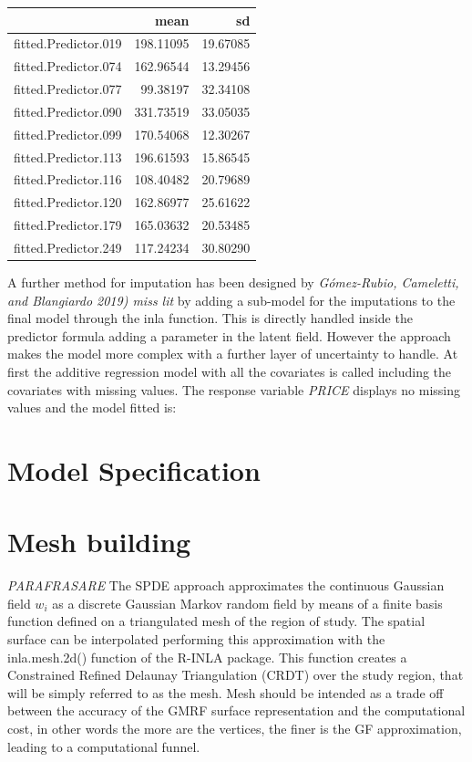 \documentclass[
  12pt,
  a4paper,
  oneside]{book}
\theoremstyle{definition}
\theoremstyle{definition}
\theoremstyle{definition}
\theoremstyle{remark}
\begin{document}
\begin{tabular}{lrr}
\toprule
  & mean & sd\\
\midrule
fitted.Predictor.019 & 198.11095 & 19.67085\\
fitted.Predictor.074 & 162.96544 & 13.29456\\
fitted.Predictor.077 & 99.38197 & 32.34108\\
fitted.Predictor.090 & 331.73519 & 33.05035\\
fitted.Predictor.099 & 170.54068 & 12.30267\\
\addlinespace
fitted.Predictor.113 & 196.61593 & 15.86545\\
fitted.Predictor.116 & 108.40482 & 20.79689\\
fitted.Predictor.120 & 162.86977 & 25.61622\\
fitted.Predictor.179 & 165.03632 & 20.53485\\
fitted.Predictor.249 & 117.24234 & 30.80290\\
\bottomrule
\end{tabular}

A further method for imputation has been designed by \emph{Gómez-Rubio, Cameletti, and Blangiardo 2019) miss lit} by adding a sub-model for the imputations to the final model through the inla function. This is directly handled inside the predictor formula adding a parameter in the latent field. However the approach makes the model more complex with a further layer of uncertainty to handle.
At first the additive regression model with all the covariates is called including the covariates with missing values. The response variable \emph{PRICE} displays no missing values and the model fitted is:

\hypertarget{model-specification}{%
\section{Model Specification}\label{model-specification}}

\hypertarget{mesh-building}{%
\section{Mesh building}\label{mesh-building}}

\emph{PARAFRASARE}
The SPDE approach approximates the continuous Gaussian field \(w_{i}\) as a discrete Gaussian Markov random field by means of a finite basis function defined on a triangulated mesh of the region of study. The spatial surface can be interpolated performing this approximation with the inla.mesh.2d() function of the R-INLA package. This function creates a Constrained Refined Delaunay Triangulation (CRDT) over the study region, that will be simply referred to as the mesh. Mesh should be intended as a trade off between the accuracy of the GMRF surface representation and the computational cost, in other words the more are the vertices, the finer is the GF approximation, leading to a computational funnel.
\end{document}
